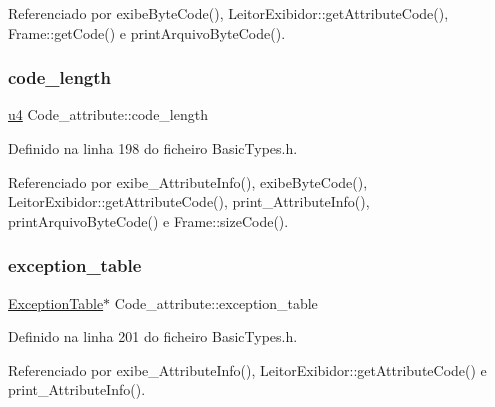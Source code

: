 Referenciado por exibe\+Byte\+Code(), Leitor\+Exibidor\+::get\+Attribute\+Code(), Frame\+::get\+Code() e print\+Arquivo\+Byte\+Code().

\mbox{\label{structCode__attribute_a80af47e824a13ef4dc604e5b8671f793}} 
\subsubsection{\texorpdfstring{code\+\_\+length}{code\_length}}
{\footnotesize\ttfamily \hyperlink{BasicTypes_8h_ae5be1f726785414dd1b77d60df074c9d}{u4} Code\+\_\+attribute\+::code\+\_\+length}



Definido na linha 198 do ficheiro Basic\+Types.\+h.



Referenciado por exibe\+\_\+\+Attribute\+Info(), exibe\+Byte\+Code(), Leitor\+Exibidor\+::get\+Attribute\+Code(), print\+\_\+\+Attribute\+Info(), print\+Arquivo\+Byte\+Code() e Frame\+::size\+Code().

\mbox{\label{structCode__attribute_a080b3f7a5717321484a648ec83c11f12}} 
\subsubsection{\texorpdfstring{exception\+\_\+table}{exception\_table}}
{\footnotesize\ttfamily \hyperlink{structExceptionTable}{Exception\+Table}$\ast$ Code\+\_\+attribute\+::exception\+\_\+table}



Definido na linha 201 do ficheiro Basic\+Types.\+h.



Referenciado por exibe\+\_\+\+Attribute\+Info(), Leitor\+Exibidor\+::get\+Attribute\+Code() e print\+\_\+\+Attribute\+Info().

\mbox{\label{structCode__attribute_a24b063ad994d77688db7468fae11e7aa}} 

